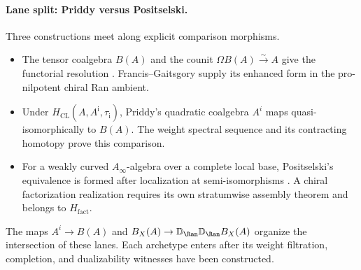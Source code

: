 \paragraph{Lane split: Priddy versus Positselski.}
\label{par:A-priddy-vs-positselski}%
%
%
%
Three constructions meet along explicit comparison morphisms.
\begin{itemize}
\item[\textsc{Full bar lane.}]
The tensor coalgebra $B(A)$ and the counit
$\Omega B(A)\xrightarrow{\sim}A$ give the functorial resolution
\cite[Corollary~2.3.4]{LV12}.  Francis--Gaitsgory supply its enhanced
form in the pro-nilpotent chiral Ran ambient.
\item[\textsc{Quadratic lane.}]
Under $H_{\mathrm{CL}}(A,A^{\mathrm i},\tau_{\mathrm i})$, Priddy's
quadratic coalgebra $A^i$ maps
quasi-isomorphically to $B(A)$.  The weight spectral sequence and its
contracting homotopy prove this comparison.
\item[\textsc{Curved completed lane.}]
For a weakly curved $A_\infty$-algebra over a complete local base,
Positselski's equivalence is formed after localization at
semi-isomorphisms \cite[Theorem~6.7.1]{Positselski2018}.  A chiral
factorization realization requires its own stratumwise assembly
theorem and belongs to $H_{\mathrm{fact}}$.
\end{itemize}
The maps $A^i\to B(A)$ and
$B_X(A)\to\mathbb D_{\Ran}\mathbb D_{\Ran}B_X(A)$ organize the
intersection of these lanes.  Each archetype enters after its
weight filtration, completion, and dualizability witnesses have been
constructed.

